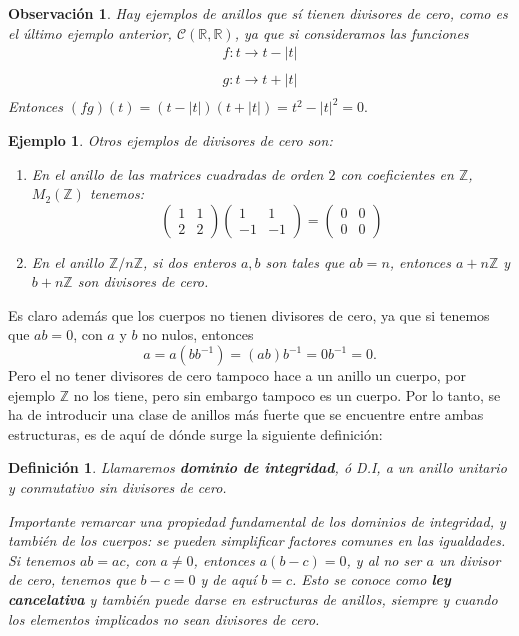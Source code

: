 \documentclass[12pt]{article}
\newtheorem{definition}[theorem]{Definición}
\newtheorem{example}{Ejemplo}[theorem]
\newtheorem{observation}{Observación}[theorem]
\providecommand{\abs}[1]{\lvert#1\rvert}
\begin{document}
\begin{observation}Hay ejemplos de anillos que sí tienen divisores de cero, como es el último ejemplo anterior, $\mathcal{C}(\mathbb{R}, \mathbb{R})$, ya que si consideramos las funciones $$\begin{array}{rccl}
f \colon t \longrightarrow t - \abs{t} \\
\end{array}
$$
$$\begin{array}{rccl}
g \colon t \longrightarrow t + \abs{t} \\
\end{array}
$$ Entonces $(fg)(t) = (t - \abs{t})(t + \abs{t}) = t^{2} -\abs{t}^{2} = 0.$
\end{observation}

\begin{example}Otros ejemplos de divisores de cero son:
\begin{enumerate}
\item En el anillo de las matrices cuadradas de orden $2$ con coeficientes en $\mathbb{Z}$, $M_2(\mathbb{Z})$ tenemos: $$\left( \begin{matrix}
1 & 1 \\
2 & 2
\end{matrix} \right)\left(
\begin{matrix}
1 & 1 \\
-1 & -1
\end{matrix}\right) =\left( \begin{matrix}
0 & 0\\
0 & 0
\end{matrix}\right)$$

\item En el anillo $\mathbb{Z}/n\mathbb{Z}$, si dos enteros $a,b$ son tales que $ab=n$, entonces $a+n\mathbb{Z}$ y $b+n\mathbb{Z}$ son divisores de cero. 
\end{enumerate}
\end{example}

Es claro además que los cuerpos no tienen divisores de cero, ya que si tenemos que $ab =0 $, con $a$ y $b$ no nulos, entonces $$a = a(bb^{-1}) = (ab)b^{-1} = 0b^{-1} = 0.$$ Pero el no tener divisores de cero tampoco hace a un anillo un cuerpo, por ejemplo $\mathbb{Z}$ no los tiene, pero sin embargo tampoco es un cuerpo. Por lo tanto, se ha de introducir una clase de anillos más fuerte que se encuentre entre ambas estructuras, es de aquí de dónde surge la siguiente definición:

\begin{definition} Llamaremos \textbf{dominio de integridad}, ó D.I, a un anillo unitario y conmutativo sin divisores de cero.

Importante remarcar una propiedad fundamental de los dominios de integridad, y también de los cuerpos: se pueden simplificar factores comunes en las igualdades. Si tenemos $ab = ac$, con $a \neq 0$, entonces $a(b-c) = 0$, y al no ser $a$ un divisor de cero, tenemos que $b-c = 0$ y de aquí $b = c$. Esto se conoce como \textbf{ley cancelativa} y también puede darse en estructuras de anillos, siempre y cuando los elementos implicados no sean divisores de cero. 
\end{definition}
\end{document}
